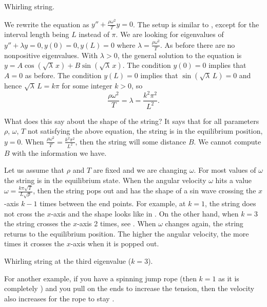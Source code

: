 \begin{myfig}
\capstart
{}
\caption{Whirling string.\label{bvp:whirstringfig}}
\end{myfig}

We rewrite the equation as
$y'' + \frac{\rho \omega^2}{T} y = 0$.
The setup is similar to , except for the
interval length being $L$ instead of $\pi$.  We are looking for eigenvalues
of $y'' + \lambda y = 0, y(0) = 0, y(L) = 0$ where
$\lambda = \frac{\rho \omega^2}{T}$.  As before
there are no nonpositive eigenvalues.  With $\lambda > 0$,
the general solution to the equation is $y = A \cos (  \sqrt{\lambda} \,x ) + B
\sin ( \sqrt{\lambda} \,x )$.  The condition $y(0) = 0$ implies that $A = 0$ as
before.  The condition $y(L) = 0$ implies that
$\sin ( \sqrt{\lambda} \, L) = 0$ and hence
$\sqrt{\lambda} \, L = k \pi$  for some integer $k > 0$, so
\begin{equation*}
\frac{\rho \omega^2}{T} = \lambda = \frac{k^2 \pi^2}{L^2} .
\end{equation*}

What does this say about the shape of the string?  It says that for
all parameters $\rho$, $\omega$, $T$ not satisfying the above equation, the
string is in the equilibrium position, $y=0$.  When 
$\frac{\rho \omega^2}{T} = \frac{k^2 \pi^2}{L^2}$, then the string will
 some distance $B$.  We cannot compute $B$
with the information we have.

Let us assume that $\rho$ and $T$ are fixed and we are changing $\omega$.
For most values of $\omega$ the string is in the equilibrium state.  When 
the angular velocity $\omega$ hits a value
$\omega = \frac{k \pi \sqrt{T}}{L\sqrt{\rho}}$, then the string 
pops out and has the shape of a sin wave crossing the
$x$-axis $k-1$ times between the end points.
For example, at $k=1$, the string does not cross the $x$-axis
and the shape looks like in .
On the other hand, when $k=3$ the string crosses the $x$-axis
2 times, see .
When $\omega$ changes again, the string returns to
the equilibrium position.  The higher the angular velocity,
the more times it crosses the $x$-axis when it is popped out.

\begin{myfig}
\capstart
{}
\caption{Whirling string at the third eigenvalue ($k=3$).\label{bvp:whirstring2fig}}
\end{myfig}

For another example, if you have a spinning jump rope (then $k=1$ as it is
completely ) and you
pull on the ends to increase the tension, then the velocity also increases
for the rope to stay .


